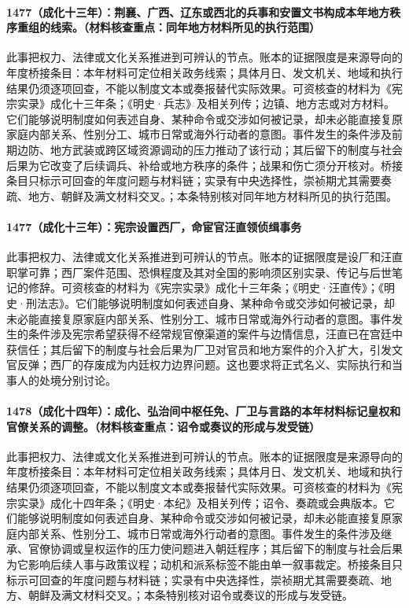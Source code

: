 \paragraph{1477（成化十三年）：荆襄、广西、辽东或西北的兵事和安置文书构成本年地方秩序重组的线索。（材料核查重点：同年地方材料所见的执行范围）} 此事把权力、法律或文化关系推进到可辨认的节点。账本的证据限度是来源导向的年度桥接条目：本年材料可定位相关政务线索；具体月日、发文机关、地域和执行结果仍须逐项回查，不能以制度文本或奏报替代实际效果。可资核查的材料为《宪宗实录》成化十三年条；《明史·兵志》及相关列传；边镇、地方志或对方材料。它们能够说明制度如何表述自身、某种命令或交涉如何被记录，却未必能直接复原家庭内部关系、性别分工、城市日常或海外行动者的意图。事件发生的条件涉及前期边防、地方武装或跨区域资源调动的压力推动了该行动；其后留下的制度与社会后果为它改变了后续调兵、补给或地方秩序的条件；战果和伤亡须分开核对。桥接条目只标示可回查的年度问题与材料链；实录有中央选择性，崇祯期尤其需要奏疏、地方、朝鲜及满文材料交叉。；本条特别核对同年地方材料所见的执行范围。

\paragraph{1477（成化十三年）：宪宗设置西厂，命宦官汪直领侦缉事务} 此事把权力、法律或文化关系推进到可辨认的节点。账本的证据限度是设厂和汪直职掌可靠；西厂案件范围、恐惧程度及其对全国的影响须区别实录、传记与后世笔记的修辞。可资核查的材料为《宪宗实录》成化十三年条；《明史·汪直传》；《明史·刑法志》。它们能够说明制度如何表述自身、某种命令或交涉如何被记录，却未必能直接复原家庭内部关系、性别分工、城市日常或海外行动者的意图。事件发生的条件涉及宪宗希望获得不经常规官僚渠道的案件与边情信息，汪直已在宫廷中获信任；其后留下的制度与社会后果为厂卫对官员和地方案件的介入扩大，引发文官反弹；西厂的存废成为内廷权力边界问题。这也要求将正式名义、实际执行和当事人的处境分别讨论。

\paragraph{1478（成化十四年）：成化、弘治间中枢任免、厂卫与言路的本年材料标记皇权和官僚关系的调整。（材料核查重点：诏令或奏议的形成与发受链）} 此事把权力、法律或文化关系推进到可辨认的节点。账本的证据限度是来源导向的年度桥接条目：本年材料可定位相关政务线索；具体月日、发文机关、地域和执行结果仍须逐项回查，不能以制度文本或奏报替代实际效果。可资核查的材料为《宪宗实录》成化十四年条；《明史·本纪》及相关列传；诏令、奏疏或会典版本。它们能够说明制度如何表述自身、某种命令或交涉如何被记录，却未必能直接复原家庭内部关系、性别分工、城市日常或海外行动者的意图。事件发生的条件涉及继承、官僚协调或皇权运作的压力使问题进入朝廷程序；其后留下的制度与社会后果为它影响后续人事与政策议程；动机和派系标签不能由单一叙事裁定。桥接条目只标示可回查的年度问题与材料链；实录有中央选择性，崇祯期尤其需要奏疏、地方、朝鲜及满文材料交叉。；本条特别核对诏令或奏议的形成与发受链。

